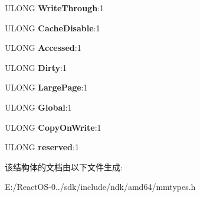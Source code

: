 \begin{DoxyCompactItemize}
\mbox{\label{struct___m_m_p_t_e___h_a_r_d_w_a_r_e_a9f13254b072c9d814dc13e01e099c20a}} 
U\+L\+O\+NG {\bfseries Write\+Through}\+:1
\item 
\mbox{\label{struct___m_m_p_t_e___h_a_r_d_w_a_r_e_a425252644e41accaeb6971eb5c5ae622}} 
U\+L\+O\+NG {\bfseries Cache\+Disable}\+:1
\item 
\mbox{\label{struct___m_m_p_t_e___h_a_r_d_w_a_r_e_ab64c2ecd26a471b61f56b2a7680f17f1}} 
U\+L\+O\+NG {\bfseries Accessed}\+:1
\item 
\mbox{\label{struct___m_m_p_t_e___h_a_r_d_w_a_r_e_a919483e8b0e6a46dc117784666d4a429}} 
U\+L\+O\+NG {\bfseries Dirty}\+:1
\item 
\mbox{\label{struct___m_m_p_t_e___h_a_r_d_w_a_r_e_aa30435115b61c7fbc6e46719c6fb1519}} 
U\+L\+O\+NG {\bfseries Large\+Page}\+:1
\item 
\mbox{\label{struct___m_m_p_t_e___h_a_r_d_w_a_r_e_a89f54ca3d353a22fbdad20f293821e0b}} 
U\+L\+O\+NG {\bfseries Global}\+:1
\item 
\mbox{\label{struct___m_m_p_t_e___h_a_r_d_w_a_r_e_a42cf50118eddca6c3ed011c23a8b358e}} 
U\+L\+O\+NG {\bfseries Copy\+On\+Write}\+:1
\item 
\mbox{\label{struct___m_m_p_t_e___h_a_r_d_w_a_r_e_a7a6a2ceb66b37139f5f505ac7137c03f}} 
U\+L\+O\+NG {\bfseries reserved}\+:1
\end{DoxyCompactItemize}


该结构体的文档由以下文件生成\+:\begin{DoxyCompactItemize}
\item 
E\+:/\+React\+O\+S-\/0../sdk/include/ndk/amd64/mmtypes.\+h\end{DoxyCompactItemize}
